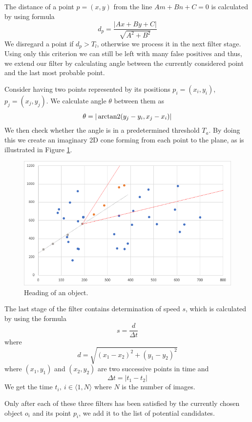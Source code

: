 	The distance of a point $p=(x,y)$ from the line $Am+Bn+C=0$ is calculated by using formula $$d_p=\frac{|Ax+By+C|}{\sqrt{A^2+B^2}}$$ We disregard a point if $d_p>T_l$, otherwise we process it in the next filter stage. Using only this criterion we can still be left with many false positives and thus, we extend our filter by calculating angle between the currently considered point and the last most probable point. 
	
	Consider having two points represented by its positions $p_{i}=(x_i,y_i)$, $p_j=(x_j,y_j)$. We calculate angle $\theta$ between them as $$\theta=|\operatorname{arctan2}(y_j-y_i, x_j-x_i)|$$ We then check whether the angle is in a predetermined threshold $T_a$. By doing this we create an imaginary 2D cone forming from each point to the plane, as is illustrated in Figure \ref{fig:regresia2}.
	
	\begin{figure}[H]
	\centering
	  \includegraphics[width=12cm]{images/regresia2}
		  \caption{Heading of an object.}
	  \label{fig:regresia2}
	\end{figure}
	
	
	The last stage of the filter contains determination of speed $s$, which is calculated by using the formula $$s=\frac{d}{{\Delta}t}$$ where $$d=\sqrt{(x_1-x_2)^2 + (y_1-y_2)^2}$$ where $(x_1,y_1)$ and $(x_2,y_2)$ are two successive points in time and $${\Delta}t=|t_1-t_2|$$ We get the time $t_{i},\ i\in\langle1,N\rangle$ where $N$ is the number of images. 
	
	Only after each of these three filters has been satisfied by the currently chosen object $o_i$ and its point $p_i$, we add it to the list of potential candidates. 
	
